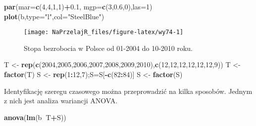 \documentclass[polish,]{book}
\newenvironment{Shaded}{\begin{snugshade}}{\end{snugshade}}
\newcommand{\DataTypeTok}[1]{\textcolor[rgb]{0.13,0.29,0.53}{#1}}
\newcommand{\DecValTok}[1]{\textcolor[rgb]{0.00,0.00,0.81}{#1}}
\newcommand{\FloatTok}[1]{\textcolor[rgb]{0.00,0.00,0.81}{#1}}
\newcommand{\KeywordTok}[1]{\textcolor[rgb]{0.13,0.29,0.53}{\textbf{#1}}}
\newcommand{\NormalTok}[1]{#1}
\newcommand{\OperatorTok}[1]{\textcolor[rgb]{0.81,0.36,0.00}{\textbf{#1}}}
\newcommand{\StringTok}[1]{\textcolor[rgb]{0.31,0.60,0.02}{#1}}
\begin{document}
\begin{Shaded}
\begin{Highlighting}[]
\KeywordTok{par}\NormalTok{(}\DataTypeTok{mar=}\KeywordTok{c}\NormalTok{(}\DecValTok{4}\NormalTok{,}\DecValTok{4}\NormalTok{,}\DecValTok{1}\NormalTok{,}\DecValTok{1}\NormalTok{)}\OperatorTok{+}\FloatTok{0.1}\NormalTok{, }\DataTypeTok{mgp=}\KeywordTok{c}\NormalTok{(}\DecValTok{3}\NormalTok{,}\FloatTok{0.6}\NormalTok{,}\DecValTok{0}\NormalTok{),}\DataTypeTok{las=}\DecValTok{1}\NormalTok{)}
\KeywordTok{plot}\NormalTok{(b,}\DataTypeTok{type=}\StringTok{"l"}\NormalTok{,}\DataTypeTok{col=}\StringTok{"SteelBlue"}\NormalTok{)}
\end{Highlighting}
\end{Shaded}

\begin{figure}[h]

{\centering \texttt{[image: NaPrzelajR\_files/figure-latex/wy74-1]} 

}

\caption{Stopa bezrobocia w Polsce od 01-2004 do 10-2010 roku.}\label{fig:wy74}
\end{figure}

\begin{Shaded}
\begin{Highlighting}[]
\NormalTok{T <-}\StringTok{ }\KeywordTok{rep}\NormalTok{(}\KeywordTok{c}\NormalTok{(}\DecValTok{2004}\NormalTok{,}\DecValTok{2005}\NormalTok{,}\DecValTok{2006}\NormalTok{,}\DecValTok{2007}\NormalTok{,}\DecValTok{2008}\NormalTok{,}\DecValTok{2009}\NormalTok{,}\DecValTok{2010}\NormalTok{),}\KeywordTok{c}\NormalTok{(}\DecValTok{12}\NormalTok{,}\DecValTok{12}\NormalTok{,}\DecValTok{12}\NormalTok{,}\DecValTok{12}\NormalTok{,}\DecValTok{12}\NormalTok{,}\DecValTok{12}\NormalTok{,}\DecValTok{9}\NormalTok{))}
\NormalTok{T <-}\StringTok{ }\KeywordTok{factor}\NormalTok{(T)}
\NormalTok{S <-}\StringTok{ }\KeywordTok{rep}\NormalTok{(}\DecValTok{1}\OperatorTok{:}\DecValTok{12}\NormalTok{,}\DecValTok{7}\NormalTok{);S=S[}\OperatorTok{-}\KeywordTok{c}\NormalTok{(}\DecValTok{82}\OperatorTok{:}\DecValTok{84}\NormalTok{)]}
\NormalTok{S <-}\StringTok{ }\KeywordTok{factor}\NormalTok{(S)}
\end{Highlighting}
\end{Shaded}

Identyfikację szeregu czasowego można przeprowadzić na kilka sposobów. Jednym z
nich jest analiza wariancji ANOVA.

\begin{Shaded}
\begin{Highlighting}[]
\KeywordTok{anova}\NormalTok{(}\KeywordTok{lm}\NormalTok{(b}\OperatorTok{~}\NormalTok{T}\OperatorTok{+}\NormalTok{S))}
\end{Highlighting}
\end{Shaded}
\end{document}
